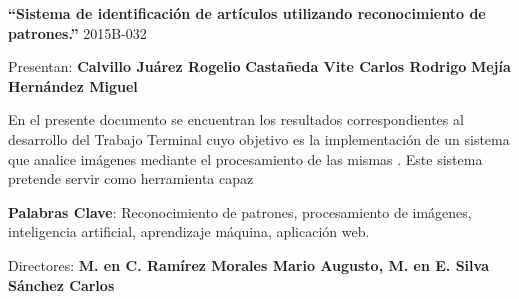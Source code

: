 \begin{titlepage}
\begin{center}
\large \textbf{``Sistema de identificaci\'on de art\'iculos utilizando reconocimiento de patrones.''} \linebreak
\large 2015B-032

\end{center}

\vspace{1.5cm}

\begin{center}
Presentan: \linebreak
\textbf{Calvillo Ju\'arez Rogelio} \linebreak
\textbf{Casta\~neda Vite Carlos Rodrigo} \linebreak
\textbf{Mej\'ia Hern\'andez Miguel} \linebreak
\end{center}

\vspace{1.5cm}


En el presente documento se encuentran los resultados correspondientes al desarrollo del Trabajo Terminal cuyo objetivo es la implementaci\'on de un sistema que analice im\'agenes mediante  el procesamiento de las mismas . Este sistema pretende servir como herramienta capaz \linebreak

\textbf{Palabras Clave}:  Reconocimiento de patrones,  procesamiento de im\'agenes, inteligencia artificial, aprendizaje máquina, aplicaci\'on web.

\vspace{1.5cm}
 
\begin{center}


Directores: \linebreak
\textbf{ M. en C. Ram\'irez Morales Mario Augusto, M. en E.  Silva S\'anchez Carlos}

\end{center}





\end{titlepage}

